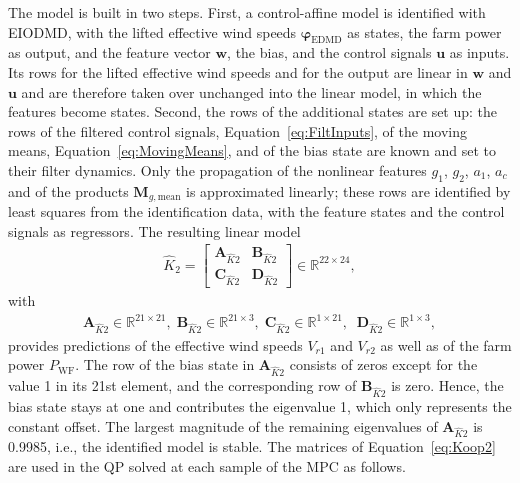 The model is built in two steps. First, a control-affine model is identified with EIODMD, with the lifted effective wind speeds $\bm{\varphi}_{\text{EDMD}}$ as states, the farm power as output, and the feature vector $\bm{w}$, the bias, and the control signals $\bm{u}$ as inputs. Its rows for the lifted effective wind speeds and for the output are linear in $\bm{w}$ and $\bm{u}$ and are therefore taken over unchanged into the linear model, in which the features become states. Second, the rows of the additional states are set up: the rows of the filtered control signals, Equation~\eqref{eq:FiltInputs}, of the moving means, Equation~\eqref{eq:MovingMeans}, and of the bias state are known and set to their filter dynamics. Only the propagation of the nonlinear features $g_1$, $g_2$, $a_1$, $a_c$ and of the products $\bm{M}_{g,\text{mean}}$ is approximated linearly; these rows are identified by least squares from the identification data, with the feature states and the control signals as regressors. The resulting linear model
\begin{align}\label{eq:Koop2}
    \hat{K}_{2} = \left[\begin{array}{c|c} \bm{A}_{\hat{K}2}  & \bm{B}_{\hat{K}2}\\ \hline \bm{C}_{\hat{K}2}  & \bm{D}_{\hat{K}2} \end{array}\right] \in \mathbb{R}^{22\times24},
\end{align}
with
\begin{align*}
    \bm{A}_{\hat{K}2} \in \mathbb{R}^{21\times21},\; \bm{B}_{\hat{K}2}\in \mathbb{R}^{21\times3},\; \bm{C}_{\hat{K}2} \in \mathbb{R}^{1\times21},\;\; \bm{D}_{\hat{K}2}\in \mathbb{R}^{1\times3},
\end{align*}
provides predictions of the effective wind speeds $V_{r1}$ and $V_{r2}$ as well as of the farm power $P_{\text{WF}}$. The row of the bias state in $\bm{A}_{\hat{K}2}$ consists of zeros except for the value 1 in its 21st element, and the corresponding row of $\bm{B}_{\hat{K}2}$ is zero. Hence, the bias state stays at one and contributes the eigenvalue 1, which only represents the constant offset. The largest magnitude of the remaining eigenvalues of $\bm{A}_{\hat{K}2}$ is 0.9985, i.e., the identified model is stable.
The matrices of Equation~\eqref{eq:Koop2} are used in the QP solved at each sample of the MPC as follows.



%

